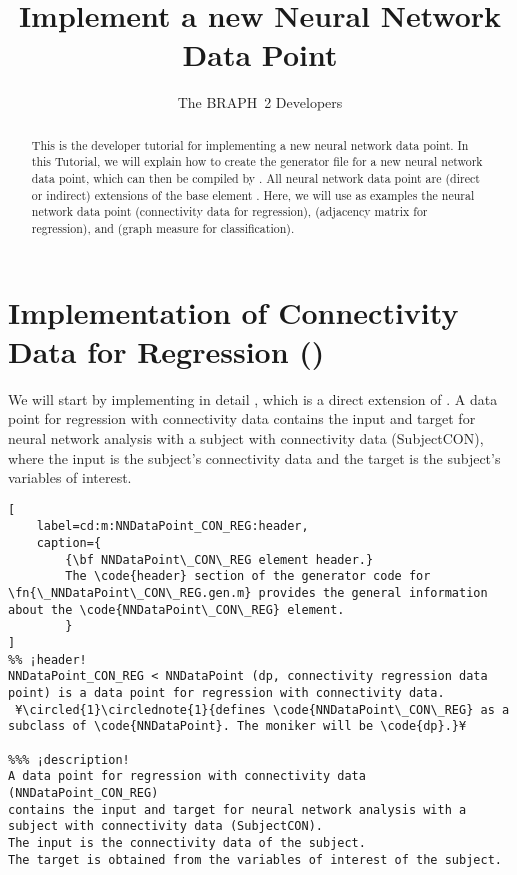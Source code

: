 \documentclass{tufte-handout}
\title{Implement a new Neural Network Data Point}
\author[The BRAPH~2 Developers]{The BRAPH~2 Developers}
\begin{document}
\maketitle

\begin{abstract}
\noindent
This is the developer tutorial for implementing a new neural network data point. 
In this Tutorial, we will explain how to create the generator file  for a new neural network data point, which can then be compiled by . All neural network data point are (direct or indirect) extensions of the base element . Here, we will use as examples the neural network data point  (connectivity data for regression),  (adjacency matrix for regression), and  (graph measure for classification).
\end{abstract}

\tableofcontents

\clearpage
\section{Implementation of Connectivity Data for Regression ()}


We will start by implementing in detail , which is a direct extension of .
A data point for regression with connectivity data  contains the input and target for neural network analysis with a subject with connectivity data (SubjectCON), where the input is the subject's connectivity data and the target is the subject's variables of interest.

\begin{lstlisting}[
	label=cd:m:NNDataPoint_CON_REG:header,
	caption={
		{\bf NNDataPoint\_CON\_REG element header.}
		The \code{header} section of the generator code for \fn{\_NNDataPoint\_CON\_REG.gen.m} provides the general information about the \code{NNDataPoint\_CON\_REG} element.
		}
]
%% ¡header!
NNDataPoint_CON_REG < NNDataPoint (dp, connectivity regression data point) is a data point for regression with connectivity data.
 ¥\circled{1}\circlednote{1}{defines \code{NNDataPoint\_CON\_REG} as a subclass of \code{NNDataPoint}. The moniker will be \code{dp}.}¥

%%% ¡description!
A data point for regression with connectivity data (NNDataPoint_CON_REG) 
contains the input and target for neural network analysis with a subject with connectivity data (SubjectCON).
The input is the connectivity data of the subject.
The target is obtained from the variables of interest of the subject.
\end{lstlisting}
\end{document}
